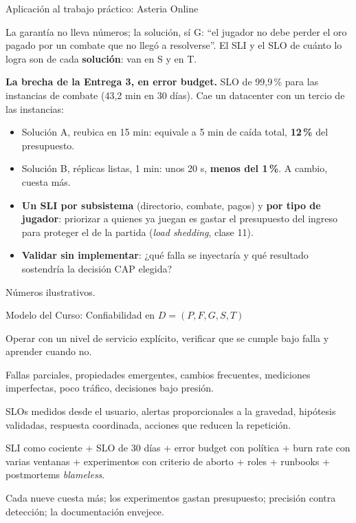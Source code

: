 \documentclass[institutional,screen,none]{ua-engineering-v6-beamer}
\begin{document}
\begin{frame}{Aplicación al trabajo práctico: Asteria Online}
\begin{block}{La garantía no lleva números; la solución, sí}
G: ``el jugador no debe perder el oro pagado por un combate que no llegó a resolverse''. El SLI y el SLO de cuánto lo logra son de cada \textbf{solución}: van en S y en T.
\end{block}

\pause

\textbf{La brecha de la Entrega 3, en error budget.} SLO de 99,9\,\% para las instancias de combate (43,2 min en 30 días). Cae un datacenter con un tercio de las instancias:
\begin{itemize}\small
\item Solución A, reubica en 15 min: equivale a 5 min de caída total, \textbf{12\,\%} del presupuesto.
\item Solución B, réplicas listas, 1 min: unos 20 s, \textbf{menos del 1\,\%}. A cambio, cuesta más.
\end{itemize}

\pause

\begin{itemize}\small
\item \textbf{Un SLI por subsistema} (directorio, combate, pagos) y \textbf{por tipo de jugador}: priorizar a quienes ya juegan es gastar el presupuesto del ingreso para proteger el de la partida (\emph{load shedding}, clase 11).
\item \textbf{Validar sin implementar}: ¿qué falla se inyectaría y qué resultado sostendría la decisión CAP elegida?
\end{itemize}

{\scriptsize\color{UAIngMuted}Números ilustrativos.}
\end{frame}

\begin{frame}{Modelo del Curso: Confiabilidad en $D = (P, F, G, S, T)$}
\begin{description}\small
\item[$P$ (Problema):] Operar con un nivel de servicio explícito, verificar que se cumple bajo falla y aprender cuando no.
\item[$F$ (Factores):] Fallas parciales, propiedades emergentes, cambios frecuentes, mediciones imperfectas, poco tráfico, decisiones bajo presión.
\item[$G$ (Garantías):] SLOs medidos desde el usuario, alertas proporcionales a la gravedad, hipótesis validadas, respuesta coordinada, acciones que reducen la repetición.
\item[$S$ (Solución):] SLI como cociente + SLO de 30 días + error budget con política + burn rate con varias ventanas + experimentos con criterio de aborto + roles + runbooks + postmortems \emph{blameless}.
\item[$T$ (Trade-offs):] Cada nueve cuesta más; los experimentos gastan presupuesto; precisión contra detección; la documentación envejece.
\end{description}
\end{frame}
\end{document}
